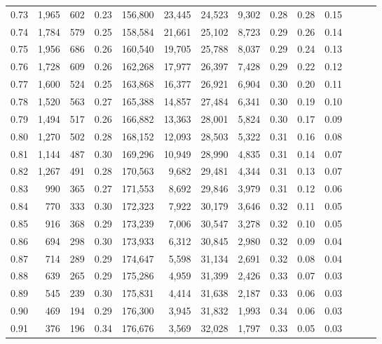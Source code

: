 \begin{tabular}{rrrrrrrrrrrrrr}
0.73 &  1,965 &  602 &  0.23 &  156,800 &   23,445 &  24,523 &   9,302 &  0.28 &  0.28 &      0.15 \\
0.74 &  1,784 &  579 &  0.25 &  158,584 &   21,661 &  25,102 &   8,723 &  0.29 &  0.26 &      0.14 \\
0.75 &  1,956 &  686 &  0.26 &  160,540 &   19,705 &  25,788 &   8,037 &  0.29 &  0.24 &      0.13 \\
0.76 &  1,728 &  609 &  0.26 &  162,268 &   17,977 &  26,397 &   7,428 &  0.29 &  0.22 &      0.12 \\
0.77 &  1,600 &  524 &  0.25 &  163,868 &   16,377 &  26,921 &   6,904 &  0.30 &  0.20 &      0.11 \\
0.78 &  1,520 &  563 &  0.27 &  165,388 &   14,857 &  27,484 &   6,341 &  0.30 &  0.19 &      0.10 \\
0.79 &  1,494 &  517 &  0.26 &  166,882 &   13,363 &  28,001 &   5,824 &  0.30 &  0.17 &      0.09 \\
0.80 &  1,270 &  502 &  0.28 &  168,152 &   12,093 &  28,503 &   5,322 &  0.31 &  0.16 &      0.08 \\
0.81 &  1,144 &  487 &  0.30 &  169,296 &   10,949 &  28,990 &   4,835 &  0.31 &  0.14 &      0.07 \\
0.82 &  1,267 &  491 &  0.28 &  170,563 &    9,682 &  29,481 &   4,344 &  0.31 &  0.13 &      0.07 \\
0.83 &    990 &  365 &  0.27 &  171,553 &    8,692 &  29,846 &   3,979 &  0.31 &  0.12 &      0.06 \\
0.84 &    770 &  333 &  0.30 &  172,323 &    7,922 &  30,179 &   3,646 &  0.32 &  0.11 &      0.05 \\
0.85 &    916 &  368 &  0.29 &  173,239 &    7,006 &  30,547 &   3,278 &  0.32 &  0.10 &      0.05 \\
0.86 &    694 &  298 &  0.30 &  173,933 &    6,312 &  30,845 &   2,980 &  0.32 &  0.09 &      0.04 \\
0.87 &    714 &  289 &  0.29 &  174,647 &    5,598 &  31,134 &   2,691 &  0.32 &  0.08 &      0.04 \\
0.88 &    639 &  265 &  0.29 &  175,286 &    4,959 &  31,399 &   2,426 &  0.33 &  0.07 &      0.03 \\
0.89 &    545 &  239 &  0.30 &  175,831 &    4,414 &  31,638 &   2,187 &  0.33 &  0.06 &      0.03 \\
0.90 &    469 &  194 &  0.29 &  176,300 &    3,945 &  31,832 &   1,993 &  0.34 &  0.06 &      0.03 \\
0.91 &    376 &  196 &  0.34 &  176,676 &    3,569 &  32,028 &   1,797 &  0.33 &  0.05 &      0.03 \\

\end{tabular}
